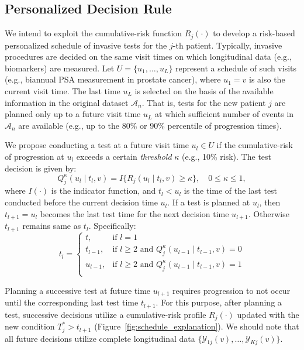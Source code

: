 \subsection{Personalized Decision Rule} 
\label{subsec:pers_schedule}
We intend to exploit the cumulative-risk function $R_j(\cdot)$ to develop a risk-based personalized schedule of invasive tests for the $j$-th patient. Typically, invasive procedures are decided on the same visit times on which longitudinal data (e.g., biomarkers) are measured. Let $U = \{u_1, \ldots, u_L\}$ represent a schedule of such visits (e.g., biannual PSA measurement in prostate cancer), where $u_1 = v$ is also the current visit time. The last time $u_L$ is selected on the basis of the available information in the original dataset $\mathcal A_n$. That is, tests for the new patient $j$ are planned only up to a future visit time $u_L$ at which sufficient number of events in $\mathcal A_n$ are available (e.g., up to the 80\% or 90\% percentile of progression times). 

We propose conducting a test at a future visit time $u_l \in U$ if the cumulative-risk of progression at $u_l$ exceeds a certain \textit{threshold} $\kappa$ (e.g., 10\% risk). The test decision is given by:
\begin{equation}
\label{eq:personalized_decision_grid}
Q_j^\kappa (u_l \mid t_l, v) = I \big \{ R_j(u_l \mid t_l, v) \geq \kappa \big\}, \quad 0 \leq \kappa \leq 1,
\end{equation}
where $I(\cdot)$ is the indicator function, and $t_l < u_l$ is the time of the last test conducted before the current decision time $u_l$. If a test is planned at $u_l$, then $t_{l+1}=u_l$ becomes the last test time for the next decision time $u_{l+1}$. Otherwise $t_{l+1}$ remains same as $t_l$. Specifically:
\begin{equation*}
t_l = \left \{ 
\begin{array}{ll}
t, & \mbox{if } l = 1\\
t_{l-1}, & \mbox{if } l \geq 2 \mbox{ and } Q_j^\kappa (u_{l-1} \mid t_{l-1}, v) = 0\\
u_{l-1}, & \mbox{if } l \geq 2 \mbox{ and } Q_j^\kappa (u_{l-1} \mid t_{l-1}, v) = 1\\
\end{array}
\right.
\end{equation*}

Planning a successive test at future time $u_{l+1}$ requires progression to not occur until the corresponding last test time $t_{l+1}$. For this purpose, after planning a test, successive decisions utilize a cumulative-risk profile $R_j (\cdot)$ updated with the new condition $T^*_j > t_{l+1}$ (Figure~\ref{fig:schedule_explanation}). We should note that all future decisions utilize complete longitudinal data $\{\mathcal{Y}_{1j}(v), \ldots, \mathcal{Y}_{Kj}(v)\}$.

